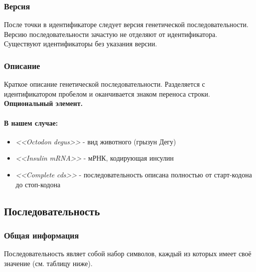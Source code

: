 \documentclass{article}
\begin{document}
                \subsubsection{Версия}
                    После точки в идентификаторе следует версия генетической последовательности. Версию последовательности зачастую не отделяют от идентификатора. Существуют идентификаторы без указания версии.
                \subsubsection{Описание}
                    Краткое описание генетической последовательности. Разделяется с идентификатором пробелом и оканчивается знаком переноса строки.\\
                    \textbf{Опциональный элемент.}
                    \paragraph{В нашем случае:}
                        \begin{itemize}
                          \item \emph{<<Octodon degus>>} - вид животного (грызун Дегу)
                          \item \emph{<<Insulin mRNA>>} - мРНК, кодирующая инсулин
                          \item \emph{<<Complete cds>>} - последовательность описана полностью от старт-кодона до стоп-кодона
                        \end{itemize}
            \subsection{Последовательность}
                \subsubsection{Общая информация}
                    Последовательность являет собой набор символов, каждый из которых имеет своё значение (см. таблицу ниже).
\end{document}

